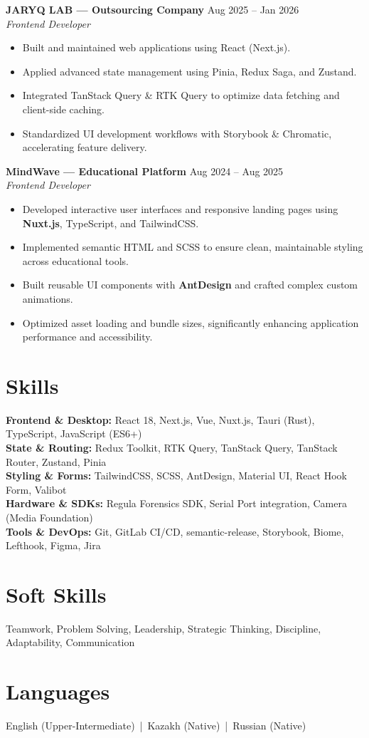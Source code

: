 \documentclass[a4paper,10pt]{article}
\begin{document}
\textbf{JARYQ LAB — Outsourcing Company} \hfill Aug 2025 – Jan 2026 \\
\textit{Frontend Developer}
\begin{itemize}
  \item Built and maintained web applications using React (Next.js).
  \item Applied advanced state management using Pinia, Redux Saga, and Zustand.
  \item Integrated TanStack Query \& RTK Query to optimize data fetching and client-side caching.
  \item Standardized UI development workflows with Storybook \& Chromatic, accelerating feature delivery.
\end{itemize}

\textbf{MindWave — Educational Platform} \hfill Aug 2024 – Aug 2025 \\
\textit{Frontend Developer}
\begin{itemize}
  \item Developed interactive user interfaces and responsive landing pages using \textbf{Nuxt.js}, TypeScript, and TailwindCSS.
  \item Implemented semantic HTML and SCSS to ensure clean, maintainable styling across educational tools.
  \item Built reusable UI components with \textbf{AntDesign} and crafted complex custom animations.
  \item Optimized asset loading and bundle sizes, significantly enhancing application performance and accessibility.
\end{itemize}

\section*{Skills}
\textbf{Frontend \& Desktop:} React 18, Next.js, Vue, Nuxt.js, Tauri (Rust), TypeScript, JavaScript (ES6+) \\
\textbf{State \& Routing:} Redux Toolkit, RTK Query, TanStack Query, TanStack Router, Zustand, Pinia \\
\textbf{Styling \& Forms:} TailwindCSS, SCSS, AntDesign, Material UI, React Hook Form, Valibot \\
\textbf{Hardware \& SDKs:} Regula Forensics SDK, Serial Port integration, Camera (Media Foundation) \\
\textbf{Tools \& DevOps:} Git, GitLab CI/CD, semantic-release, Storybook, Biome, Lefthook, Figma, Jira

\section*{Soft Skills}
Teamwork, Problem Solving, Leadership, Strategic Thinking, Discipline, Adaptability, Communication

\section*{Languages}
English (Upper-Intermediate) \,|\, Kazakh (Native) \,|\, Russian (Native)
\end{document}
